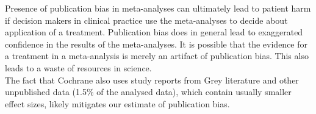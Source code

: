\documentclass[11pt,a4paper,twoside]{book}\usepackage[]{graphicx}\usepackage[]{color}
\begin{document}
Presence of publication bias in meta-analyses can ultimately lead to patient harm if decision makers in clinical practice use the meta-analyses to decide about application of a treatment. Publication bias does in general lead to exaggerated confidence in the results of the meta-analyses. It is possible that the  evidence for a treatment in a meta-analysis is merely an artifact of publication bias. This also leads to a waste of resources in science. \\
The fact that Cochrane also uses study reports from Grey literature and other unpublished data (1.5\% of the analysed data), which contain usually smaller effect sizes, likely mitigates our estimate of publication bias.
\end{document}
